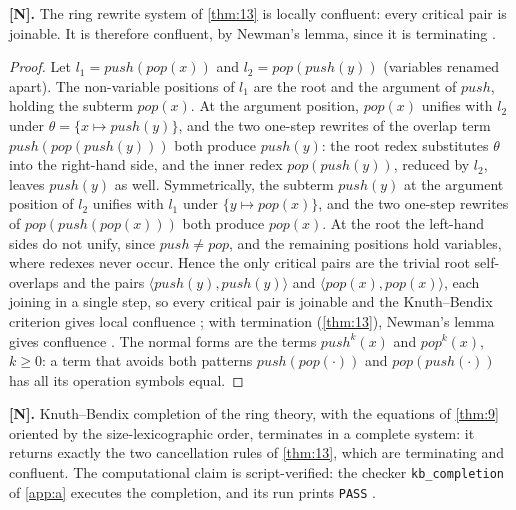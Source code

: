 \begin{theorem}\label{thm:14}
\textbf{[N].} The ring rewrite system of \autoref{thm:13} is locally
confluent: every critical pair is joinable. It is therefore confluent, by
Newman's lemma, since it is terminating \cite{newman}.
\end{theorem}

\begin{proof}
Let $l_1 = \mathit{push} (\mathit{pop} (x))$ and
$l_2 = \mathit{pop} (\mathit{push} (y))$ (variables renamed apart). The
non-variable positions of $l_1$ are the root and the argument of
$\mathit{push}$, holding the subterm $\mathit{pop} (x)$. At the argument
position, $\mathit{pop} (x)$ unifies with $l_2$ under
$\theta = \{x \mapsto \mathit{push} (y)\}$, and the two one-step rewrites of
the overlap term $\mathit{push} (\mathit{pop} (\mathit{push} (y)))$ both
produce $\mathit{push} (y)$: the root redex substitutes $\theta$ into the
right-hand side, and the inner redex $\mathit{pop} (\mathit{push} (y))$,
reduced by $l_2$, leaves $\mathit{push} (y)$ as well. Symmetrically, the
subterm $\mathit{push} (y)$ at the argument position of $l_2$ unifies with
$l_1$ under $\{y \mapsto \mathit{pop} (x)\}$, and the two one-step rewrites
of $\mathit{pop} (\mathit{push} (\mathit{pop} (x)))$ both produce
$\mathit{pop} (x)$. At the root the left-hand sides do not unify, since
$\mathit{push} \neq \mathit{pop}$, and the remaining positions hold
variables, where redexes never occur. Hence the only critical pairs are the
trivial root self-overlaps and the pairs
$\langle \mathit{push} (y), \mathit{push} (y) \rangle$ and
$\langle \mathit{pop} (x), \mathit{pop} (x) \rangle$, each joining in a
single step, so every critical pair is joinable and the Knuth--Bendix
criterion gives local confluence \cite{knuthbendix}; with termination
(\autoref{thm:13}), Newman's lemma gives confluence \cite{newman}. The
normal forms are the terms $\mathit{push}^{k} (x)$ and $\mathit{pop}^{k} (x)$,
$k \geq 0$: a term that avoids both patterns
$\mathit{push} (\mathit{pop} (\cdot))$ and
$\mathit{pop} (\mathit{push} (\cdot))$ has all its operation symbols equal.
\end{proof}

\begin{theorem}\label{thm:15}
\textbf{[N].} Knuth--Bendix completion of the ring theory, with the
equations of \autoref{thm:9} oriented by the size-lexicographic order,
terminates in a complete system: it returns exactly the two cancellation
rules of \autoref{thm:13}, which are terminating and confluent. The
computational claim is script-verified: the checker
\texttt{kb\_completion} of \autoref{app:a} executes the completion, and its
run prints \texttt{PASS} \cite{knuthbendix}.
\end{theorem}

